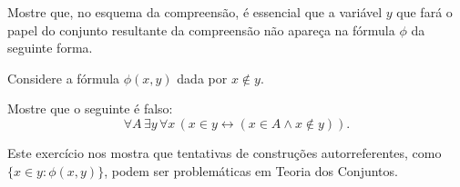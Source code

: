 \begin{exercise}\label{exr:compreensaoAutorreferente}
    Mostre que, no esquema da compreensão, é essencial que a variável $y$ que fará o papel do conjunto resultante da compreensão não apareça na fórmula $\phi$ da seguinte forma.

    Considere a fórmula $\phi(x, y)$ dada por $x \notin y$.

    Mostre que o seguinte é falso:
    \[
    \forall A\, \exists y\, \forall x\, (x \in y \leftrightarrow (x \in A \land x \notin y)).
    \]

    Este exercício nos mostra que tentativas de construções autorreferentes, como $\{x \in y : \phi(x, y)\}$, podem ser problemáticas em Teoria dos Conjuntos.
\end{exercise}
